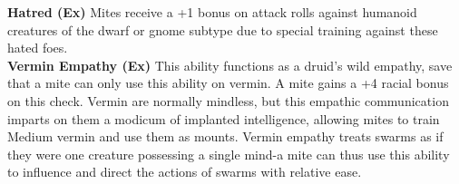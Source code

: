 \textbf{Hatred (Ex)} Mites receive a +1 bonus on attack rolls against humanoid creatures of the dwarf or gnome subtype due to special training against these hated foes. \\

\textbf{Vermin Empathy (Ex)} This ability functions as a druid’s wild empathy, save that a mite can only use this ability on vermin. A mite gains a +4 racial bonus on this check. Vermin are normally mindless, but this empathic communication imparts on them a modicum of implanted intelligence, allowing mites to train Medium vermin and use them as mounts. Vermin empathy treats swarms as if they were one creature possessing a single mind-a mite can thus use this ability to influence and direct the actions of swarms with relative ease. \\

\newpage
